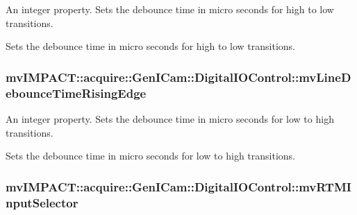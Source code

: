 An integer property. Sets the debounce time in micro seconds for high to low transitions. 

Sets the debounce time in micro seconds for high to low transitions. \hypertarget{classmv_i_m_p_a_c_t_1_1acquire_1_1_gen_i_cam_1_1_digital_i_o_control_aeaf56d4b22274bef29f4b24d2ee8047a}{
\subsubsection[{mv\+Line\+Debounce\+Time\+Rising\+Edge}]{ mv\+I\+M\+P\+A\+C\+T\+::acquire\+::\+Gen\+I\+Cam\+::\+Digital\+I\+O\+Control\+::mv\+Line\+Debounce\+Time\+Rising\+Edge}}\label{classmv_i_m_p_a_c_t_1_1acquire_1_1_gen_i_cam_1_1_digital_i_o_control_aeaf56d4b22274bef29f4b24d2ee8047a}


An integer property. Sets the debounce time in micro seconds for low to high transitions. 

Sets the debounce time in micro seconds for low to high transitions. \hypertarget{classmv_i_m_p_a_c_t_1_1acquire_1_1_gen_i_cam_1_1_digital_i_o_control_adb3910b12f431df5027cf4edbce49040}{
\subsubsection[{mv\+R\+T\+M\+Input\+Selector}]{ mv\+I\+M\+P\+A\+C\+T\+::acquire\+::\+Gen\+I\+Cam\+::\+Digital\+I\+O\+Control\+::mv\+R\+T\+M\+Input\+Selector}}\label{classmv_i_m_p_a_c_t_1_1acquire_1_1_gen_i_cam_1_1_digital_i_o_control_adb3910b12f431df5027cf4edbce49040}


